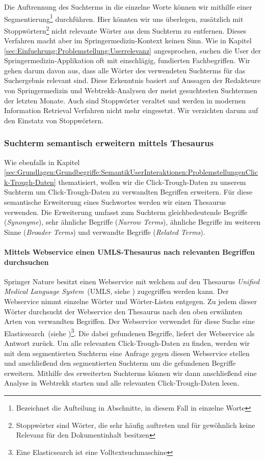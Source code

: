 Die Auftrennung des Suchterms in die einzelne Worte können wir mithilfe einer Segmentierung\footnote{Bezeichnet die Aufteilung in Abschnitte, in diesem Fall in einzelne Worte} durchführen. Hier könnten wir uns überlegen, zusätzlich mit Stoppwörtern\footnote{Stoppwörter sind Wörter, die sehr häufig auftreten und für gewöhnlich keine Relevanz für den Dokumentinhalt besitzen} nicht relevante Wörter aus dem Suchterm zu entfernen. Dieses Verfahren macht aber im Springermedizin-Kontext keinen Sinn. Wie in Kapitel \ref{sec:Einfuehrung:Problemstellung:Userrelevanz} angesprochen, suchen die User der Springermedizin-Applikation oft mit einschlägig, fundierten Fachbegriffen. Wir gehen darum davon aus, dass alle Wörter des verwendeten Suchterms für das Suchergebnis relevant sind. Diese Erkenntnis basiert auf Aussagen der Redakteure von Springermedizin und Webtrekk-Analysen der meist gesuchtesten Suchtermen der letzten Monate. Auch sind Stoppwörter veraltet und werden in modernen Information Retrieval Verfahren nicht mehr eingesetzt. Wir verzichten darum auf den Einstatz von Stoppwörtern.

\subsubsection{Suchterm semantisch erweitern mittels Thesaurus}
\label{sec:Reranking:Methodik:SuchtermSegmentierung:SuchtermThesaurus}

Wie ebenfalls in Kapitel \ref{sec:Grundlagen:Grundbegriffe:SemantikUserInteraktionen:ProblemstellungenClick-Trough-Daten} thematisiert, wollen wir die Click-Trough-Daten zu unserem Suchterm um Click-Trough-Daten zu verwandten Begriffen erweitern. Für diese semantische Erweiterung eines Suchwortes werden wir einen Thesaurus verwenden. Die Erweiterung umfasst zum Suchterm gleichbedeutende Begriffe (\textit{Synonyme}), sehr ähnliche Begriffe (\textit{Narrow Terms}), ähnliche Begriffe im weiteren Sinne (\textit{Broader Terms}) und verwandte Begriffe (\textit{Related Terms}).

\paragraph{Mittels Webservice einen UMLS-Thesaurus nach relevanten Begriffen durchsuchen}
Springer Nature besitzt einen Webservice mit welchem auf den Thesaurus \textit{Unified Medical Language System}~(UMLS, siehe \cite{UMLS}) zugegriffen werden kann. Der Webservice nimmt einzelne Wörter und Wörter-Listen entgegen. Zu jedem dieser Wörter durchsucht der Webservice den Thesaurus nach den oben erwähnten Arten von verwandten Begriffen. Der Webservice verwendet für diese Suche eine Elasticsearch~(siehe \cite{elasticsearch})\footnote{Eine Elasticsearch ist eine Volltextsuchmaschine}. Die dabei gefundenen Begriffe, liefert der Webservice als Antwort zurück. Um alle relevanten Click-Trough-Daten zu finden, werden wir mit dem segmentierten Suchterm eine Anfrage gegen diesen Webservice stellen und anschließend den segmentierten Suchterm um die gefundenen Begriffe erweitern. Mithilfe des erweiterten Suchterms können wir dann anschließend eine Analyse in Webtrekk starten und alle relevanten Click-Trough-Daten lesen. 

